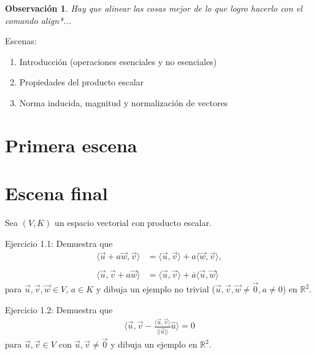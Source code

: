 \documentclass[12pt,dvipsnames]{article}
\newtheorem{obs}{Observación}[section]
\numberwithin{equation}{section}
\begin{document}
\begin{obs}
Hay que alinear las cosas mejor de lo que logro hacerlo con el comando align*...
\end{obs}

Escenas:

\begin{enumerate}
    \item Introducción (operaciones esenciales y no esenciales) 
    \item Propiedades del producto escalar
    \item Norma inducida, magnitud y normalización de vectores
\end{enumerate}


\newpage
\section{Primera escena}



\newpage
\section{Escena final}

\begin{center}
    Sea $(V,K)$ un espacio vectorial con producto escalar.
\end{center}

Ejercicio 1.1: Demuestra que
\begin{align*}
    \langle \vec{u} + a\vec{w}, \vec{v}\rangle &= \langle \vec{u},\vec{v}\rangle + a\langle \vec{w}, \vec{v}\rangle, \\
    \\
    \langle \vec{u}, \vec{v} + a\vec{w}\rangle &= \langle \vec{u},\vec{v}\rangle + \overline{a}\langle \vec{u}, \vec{w}\rangle
\end{align*} para $\vec{u},\vec{v},\vec{w}\in V$, $a\in K$ y dibuja un ejemplo no trivial ($\vec{u},\vec{v},\vec{w}\neq\vec{0}, a\neq 0$) en $\mathbb{R}^2$.

\hspace{5mm}

Ejercicio 1.2: Demuestra que
\begin{align*}
    \bigg\langle \vec{u}, \vec{v} - \frac{\langle \vec{u}, \vec{v}\rangle}{||\vec{u}||}\hat{u} \bigg\rangle = 0
\end{align*} para $\vec{u},\vec{v}\in V$ con $\vec{u},\vec{v}\neq\vec{0}$ y dibuja un ejemplo en $\mathbb{R}^2$.
\end{document}
